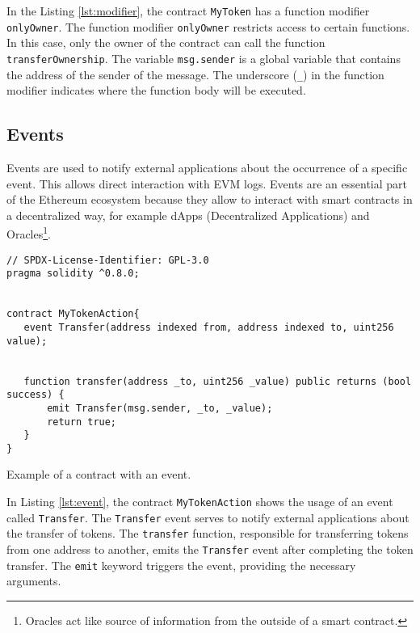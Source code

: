 In the Listing \ref{lst:modifier}, the contract \texttt{MyToken} has a function modifier \texttt{onlyOwner}. The function modifier \texttt{onlyOwner} restricts
access to certain functions. In this case, only the owner of the contract can call the function \texttt{transferOwnership}.
The variable \texttt{msg.sender} is a global variable that contains the address of the sender of the message. The underscore (\texttt{\_}) in the function modifier
indicates where the function body will be executed.



\subsection{Events}

Events are used to notify external applications about the occurrence of a specific event. This allows direct interaction with EVM logs.
Events are an essential part of the Ethereum ecosystem because they allow to interact with smart contracts in a decentralized way, for example
dApps (Decentralized Applications) and Oracles\footnote{Oracles act like source of information from the outside of a smart contract.}.

\begin{listing}[!ht]
   \begin{verbatim}
// SPDX-License-Identifier: GPL-3.0
pragma solidity ^0.8.0;


contract MyTokenAction{
   event Transfer(address indexed from, address indexed to, uint256 value);


   function transfer(address _to, uint256 _value) public returns (bool success) {
       emit Transfer(msg.sender, _to, _value);
       return true;
   }
}
   \end{verbatim}
   \caption{Example of a contract with an event.}
   \label{lst:event}
\end{listing}


In Listing \ref{lst:event}, the contract \texttt{MyTokenAction} shows the usage of an event called \texttt{Transfer}. The \texttt{Transfer} event serves to notify external applications about the transfer of tokens. The \texttt{transfer} function, responsible for transferring tokens from one address to another, emits the
\texttt{Transfer} event after completing the token transfer. The \texttt{emit} keyword triggers the event, providing the necessary arguments.

